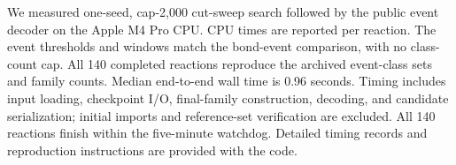 We measured one-seed, cap-2,000 cut-sweep search followed by the public event decoder on the Apple M4 Pro CPU. CPU times are reported per reaction. The event thresholds and windows match the bond-event comparison, with no class-count cap. All 140 completed reactions reproduce the archived event-class sets and family counts. Median end-to-end wall time is 0.96 seconds. Timing includes input loading, checkpoint I/O, final-family construction, decoding, and candidate serialization; initial imports and reference-set verification are excluded. All 140 reactions finish within the five-minute watchdog. Detailed timing records and reproduction instructions are provided with the code.
